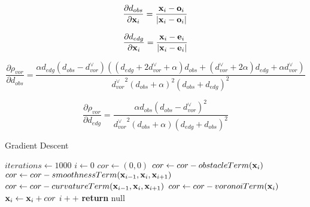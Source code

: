 \begin{equation}
\frac{\partial d_{obs}}{\partial \mathbf{x}_i} = \frac{\mathbf{x}_i-\mathbf{o}_i}{|\mathbf{x}_i-\mathbf{o}_i|}
\end{equation}

\begin{equation}
\frac{\partial d_{edg}}{\partial \mathbf{x}_i} =\frac{\mathbf{x}_i-\mathbf{e}_i}{|\mathbf{x}_i-\mathbf{e}_i|}
\end{equation}

\begin{equation}
\frac{\partial\rho_{vor}}{\partial d_{obs}} = \frac{\alpha d_{edg}\left(d_{obs}-d_{vor}^{\lor}\right)\left(\left(d_{edg}+2d_{vor}^{\lor}+\alpha\right) d_{obs}+\left(d_{vor}^{\lor}+2\alpha\right)d_{edg}+\alpha d_{vor}^{\lor}\right)}{{d_{vor}^{\lor}}^2\left(d_{obs}+\alpha\right)^2\left(d_{obs}+d_{edg}\right)^2}
\end{equation}

\begin{equation}
\frac{\partial\rho_{vor}}{\partial d_{edg}} =  \frac{\alpha d_{obs}\left(d_{obs}-d_{vor}^{\lor}\right)^2}{{d_{vor}^{\lor}}^2\left(d_{obs}+\alpha\right)\left(d_{edg}+d_{obs}\right)^2}
\end{equation}

\begin{algorithm}
    \caption{Gradient Descent}\label{alg:gradientDescent}
    \begin{algorithmic}[1]
    \State $iterations \gets 1000$
    \State $i \gets 0$
        	\ForAll {$\bldx \in \calP$}
        		\State $cor \gets  (0,0)$
        		\State $cor \gets  cor - obstacleTerm(\mathbf{x}_{i})$
        		\State $cor \gets  cor - smoothnessTerm(\mathbf{x}_{i-1},\mathbf{x}_{i},\mathbf{x}_{i+1})$
        		\State $cor \gets  cor - curvatureTerm(\mathbf{x}_{i-1},\mathbf{x}_{i},\mathbf{x}_{i+1})$
        		\State $cor \gets  cor - voronoiTerm(\mathbf{x}_{i})$
        		\State $\mathbf{x}_{i} \gets \mathbf{x}_{i} + cor$
        	\EndFor
        \State $i++$
        \EndWhile
        \State \textbf{return} null
    \end{algorithmic}
\end{algorithm}